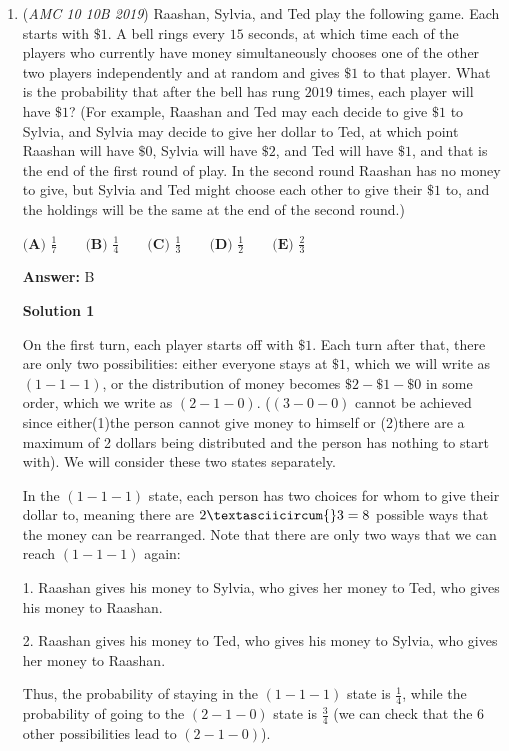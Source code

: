 \begin{enumerate}
	\item (\textit{AMC 10 10B 2019}) Raashan, Sylvia, and Ted play the following game. Each starts with $\$1$. A bell rings every $15$ seconds, at which time each of the players who currently have money simultaneously chooses one of the other two players independently and at random and gives $\$1$ to that player. What is the probability that after the bell has rung $2019$ times, each player will have $\$1$? (For example, Raashan and Ted may each decide to give $\$1$ to Sylvia, and Sylvia may decide to give her dollar to Ted, at which point Raashan will have $\$0$, Sylvia will have $\$2$, and Ted will have $\$1$, and that is the end of the first round of play. In the second round Raashan has no money to give, but Sylvia and Ted might choose each other to give their $\$1$ to, and the holdings will be the same at the end of the second round.)


 $\textbf{(A) } \frac{1}{7} \qquad\textbf{(B) } \frac{1}{4} \qquad\textbf{(C) } \frac{1}{3} \qquad\textbf{(D) } \frac{1}{2} \qquad\textbf{(E) } \frac{2}{3}$

 \textbf{Answer: }B



\textbf{Solution 1}

On the first turn, each player starts off with $\$1$. Each turn after that, there are only two possibilities: either everyone stays at $\$1$, which we will write as $(1-1-1)$, or the distribution of money becomes $\$2-\$1-\$0$ in some order, which we write as $(2-1-0)$. ($(3-0-0)$ cannot be achieved since either(1)the person cannot give money to himself or (2)there are a maximum of 2 dollars being distributed and the person has nothing to start with). We will consider these two states separately.

 In the $(1-1-1)$ state, each person has two choices for whom to give their dollar to, meaning there are $2\textasciicircum{}3=8$ possible ways that the money can be rearranged. Note that there are only two ways that we can reach $(1-1-1)$ again: 

 1. Raashan gives his money to Sylvia, who gives her money to Ted, who gives his money to Raashan.

 2. Raashan gives his money to Ted, who gives his money to Sylvia, who gives her money to Raashan.

 Thus, the probability of staying in the $(1-1-1)$ state is $\frac{1}{4}$, while the probability of going to the $(2-1-0)$ state is $\frac{3}{4}$ (we can check that the 6 other possibilities lead to $(2-1-0)$).


\end{enumerate}
